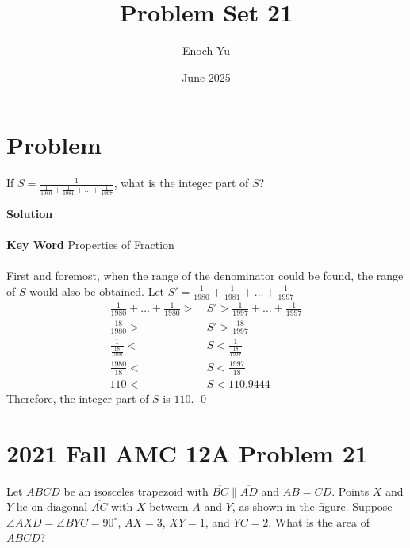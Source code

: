 \documentclass{article}
\title{Problem Set 21}
\author{Enoch Yu}
\date{June 2025}
\newenvironment{solution}{\begin{trivlist}\item[]{\bf Solution}}{\qed \end{trivlist}}
\begin{document}
\section*{Problem}
If $S = \frac{1}{\frac{1}{1980} + \frac{1}{1981} + \dots + \frac{1}{1997}}$, what is the integer part of $S$?
\begin{solution}
\\\\
\textbf{Key Word} Properties of Fraction
\\\\
First and foremost, when the range of the denominator could be found, the range of $S$ would also be obtained. Let $S' = \frac{1}{1980} + \frac{1}{1981} + \dots + \frac{1}{1997}$
\begin{align*}
    \frac{1}{1980} + \dots + \frac{1}{1980} >\ &S' > \frac{1}{1997} + \dots + \frac{1}{1997} \\
    \frac{18}{1980} >\ &S' > \frac{18}{1997} \\
    \frac{1}{\frac{18}{1980}} <\ &S < \frac{1}{\frac{18}{1997}} \\
    \frac{1980}{18} <\ &S < \frac{1997}{18} \\
    110 <\ &S < 110.9444
\end{align*}
Therefore, the integer part of $S$ is $\boxed{110}$.
\end{solution}

\newpage
\section*{2021 Fall AMC 12A Problem 21}
Let $ABCD$ be an isosceles trapezoid with $\overline{BC} \parallel \overline{AD}$ and $AB=CD$. Points $X$ and $Y$ lie on diagonal $\overline{AC}$ with $X$ between $A$ and $Y$, as shown in the figure. Suppose $\angle AXD = \angle BYC = 90^\circ$, $AX = 3$, $XY = 1$, and $YC = 2$. What is the area of $ABCD$?
\end{document}
